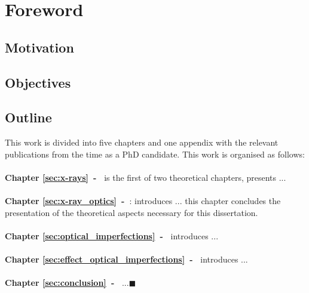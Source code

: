 \chapter*{Foreword}


\section*{Motivation}



\section*{Objectives}


\section*{Outline}

This work is divided into five chapters and one appendix with the relevant publications from the time as a PhD candidate. This work is organised as follows:
\\
\\
\textbf{Chapter \ref{sec:x-rays}~-~} is the first of two theoretical chapters, presents ...
\\
\\
\textbf{Chapter \ref{sec:x-ray_optics}~-~}: introduces ... this chapter concludes the presentation of the theoretical aspects necessary for this dissertation.
\\
\\
\textbf{Chapter \ref{sec:optical_imperfections}~-~} introduces ...
\\
\\
\textbf{Chapter \ref{sec:effect_optical_imperfections}~-~} introduces ...
\\
\\
\textbf{Chapter \ref{sec:conclusion}~-~}  ...$\blacksquare$
